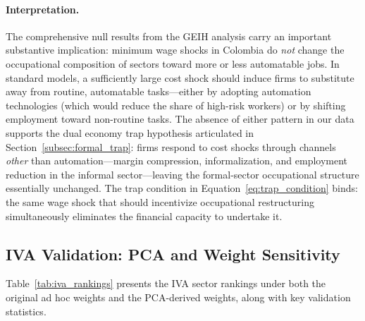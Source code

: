 \documentclass[5p,times,authoryear]{elsarticle}
\begin{document}
\paragraph{Interpretation.} The comprehensive null results from the GEIH analysis carry an important substantive implication: minimum wage shocks in Colombia do \emph{not} change the occupational composition of sectors toward more or less automatable jobs. In standard models, a sufficiently large cost shock should induce firms to substitute away from routine, automatable tasks---either by adopting automation technologies (which would reduce the share of high-risk workers) or by shifting employment toward non-routine tasks. The absence of either pattern in our data supports the dual economy trap hypothesis articulated in Section~\ref{subsec:formal_trap}: firms respond to cost shocks through channels \emph{other} than automation---margin compression, informalization, and employment reduction in the informal sector---leaving the formal-sector occupational structure essentially unchanged. The trap condition in Equation~\eqref{eq:trap_condition} binds: the same wage shock that should incentivize occupational restructuring simultaneously eliminates the financial capacity to undertake it.

\FloatBarrier

\subsection{IVA Validation: PCA and Weight Sensitivity}
\label{subsec:results_iva}

Table~\ref{tab:iva_rankings} presents the IVA sector rankings under both the original ad hoc weights and the PCA-derived weights, along with key validation statistics.
\end{document}
